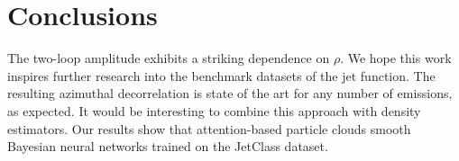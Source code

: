 \section{Conclusions}\label{sec:conclusions}

The two-loop amplitude exhibits a striking dependence on $\rho$. We hope
this work inspires further research into the benchmark datasets of the
jet function. The resulting azimuthal decorrelation is state of the art
for any number of emissions, as expected. It would be interesting to
combine this approach with density estimators. Our results show that
attention-based particle clouds smooth Bayesian neural networks trained
on the JetClass dataset.

